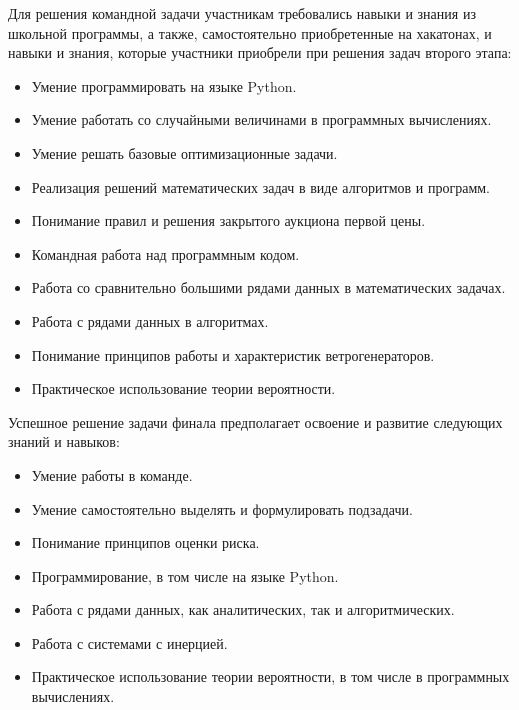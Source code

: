 Для решения командной задачи участникам требовались навыки и знания из школьной программы, а также, самостоятельно приобретенные на хакатонах, и навыки и знания, которые участники приобрели при решения задач второго этапа:
\begin{itemize}
\item Умение программировать на языке Python.
\item Умение работать со случайными величинами в программных вычислениях.
\item Умение решать базовые оптимизационные задачи.
\item Реализация решений математических задач в виде алгоритмов и программ.
\item Понимание правил и решения закрытого аукциона первой цены.
\item Командная работа над программным кодом.
\item Работа со сравнительно большими рядами данных в математических задачах.
\item Работа с рядами данных в алгоритмах.
\item Понимание принципов работы и характеристик ветрогенераторов.
\item Практическое использование теории вероятности.
\end{itemize}

Успешное решение задачи финала предполагает освоение и развитие следующих знаний и навыков:
\begin{itemize}
\item Умение работы в команде.
\item Умение самостоятельно выделять и формулировать подзадачи.
\item Понимание принципов оценки риска.
\item Программирование, в том числе на языке Python.
\item Работа с рядами данных, как аналитических, так и алгоритмических.
\item Работа с системами с инерцией.
\item Практическое использование теории вероятности, в том числе в программных вычислениях.
\end{itemize}